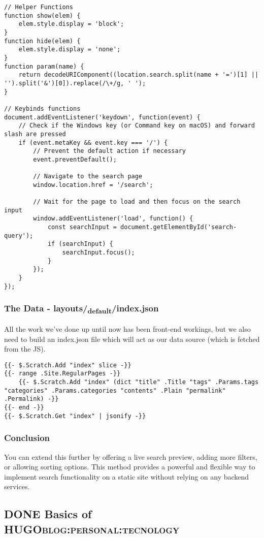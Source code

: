 \documentclass[11pt]{article}
\begin{document}
\begin{verbatim}
// Helper Functions
function show(elem) {
    elem.style.display = 'block';
}
function hide(elem) {
    elem.style.display = 'none';
}
function param(name) {
    return decodeURIComponent((location.search.split(name + '=')[1] || '').split('&')[0]).replace(/\+/g, ' ');
}

// Keybinds functions
document.addEventListener('keydown', function(event) {
    // Check if the Windows key (or Command key on macOS) and forward slash are pressed
    if (event.metaKey && event.key === '/') {
        // Prevent the default action if necessary
        event.preventDefault();

        // Navigate to the search page
        window.location.href = '/search';

        // Wait for the page to load and then focus on the search input
        window.addEventListener('load', function() {
            const searchInput = document.getElementById('search-query');
            if (searchInput) {
                searchInput.focus();
            }
        });
    }
});
\end{verbatim}
\subsubsection{The Data - layouts/\textsubscript{default}/index.json}
\label{sec:orgb9bacfa}
All the work we’ve done up until now has been front-end workings, but we also need to build an index.json file which will act as our data source (which is fetched from the JS).

\begin{verbatim}
{{- $.Scratch.Add "index" slice -}}
{{- range .Site.RegularPages -}}
    {{- $.Scratch.Add "index" (dict "title" .Title "tags" .Params.tags "categories" .Params.categories "contents" .Plain "permalink" .Permalink) -}}
{{- end -}}
{{- $.Scratch.Get "index" | jsonify -}}
\end{verbatim}
\subsubsection{Conclusion}
\label{sec:org5198d48}
You can extend this further by offering a live search preview, adding more filters, or allowing sorting options. This method provides a powerful and flexible way to implement search functionality on a static site without relying on any backend services.
\subsection{{\bfseries\sffamily DONE} Basics of HUGO\hfill{}\textsc{blog:personal:tecnology}}
\label{sec:org9a4bac8}
\end{document}
